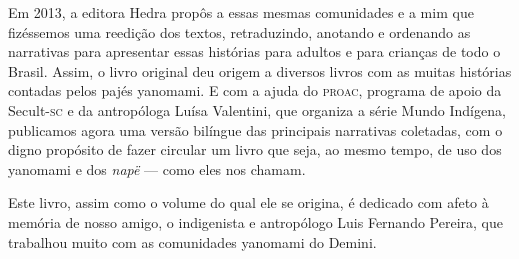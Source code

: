 Em 2013, a editora Hedra propôs a essas mesmas comunidades e a mim que
fizéssemos uma reedição dos textos, retraduzindo, anotando e ordenando as
narrativas para apresentar essas histórias para adultos e para crianças de todo
o Brasil. Assim, o livro original deu origem a diversos livros com as muitas
histórias contadas pelos pajés yanomami.  E com a ajuda do \textsc{proac},
programa de apoio da Secult-\textsc{sc} e da antropóloga Luísa Valentini, que organiza a
série Mundo Indígena, publicamos agora uma versão bilíngue das principais
narrativas coletadas, com o digno propósito de fazer circular um livro que
seja, ao mesmo tempo, de uso dos yanomami e dos \textit{napë} --- como eles nos chamam. 

Este livro, assim como o volume do qual ele se origina, é dedicado com afeto à memória de nosso amigo, o indigenista e antropólogo Luis Fernando Pereira, que trabalhou muito com as comunidades yanomami do Demini.